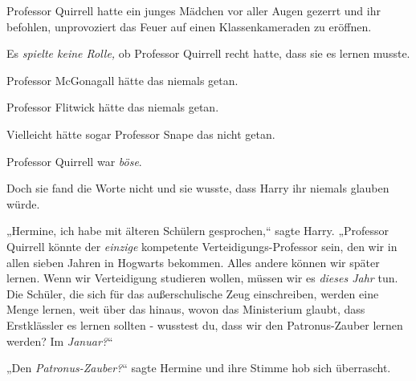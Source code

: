 Professor Quirrell hatte ein junges Mädchen vor aller Augen gezerrt und ihr befohlen, unprovoziert das Feuer auf einen Klassenkameraden zu eröffnen.

Es \emph{spielte keine Rolle,} ob Professor Quirrell recht hatte, dass sie es lernen musste.

Professor McGonagall hätte das niemals getan.

Professor Flitwick hätte das niemals getan.

Vielleicht hätte sogar Professor Snape das nicht getan.

Professor Quirrell war \emph{böse}.

Doch sie fand die Worte nicht und sie wusste, dass Harry ihr niemals glauben würde.

„Hermine, ich habe mit älteren Schülern gesprochen,“ sagte Harry. „Professor Quirrell könnte der \emph{einzige} kompetente Verteidigungs-Professor sein, den wir in allen sieben Jahren in Hogwarts bekommen. Alles andere können wir später lernen. Wenn wir Verteidigung studieren wollen, müssen wir es \emph{dieses Jahr} tun. Die Schüler, die sich für das außerschulische Zeug einschreiben, werden eine Menge lernen, weit über das hinaus, wovon das Ministerium glaubt, dass Erstklässler es lernen sollten - wusstest du, dass wir den Patronus-Zauber lernen werden? Im \emph{Januar?}“

„Den \emph{Patronus-Zauber?}“ sagte Hermine und ihre Stimme hob sich überrascht.

